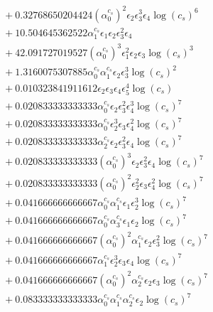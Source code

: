 \documentclass[10pt]{article}
\begin{document}
\begin{align*}
&{}  + 0.32768650204424 \left(\alpha_{0}^{c_s}\right)^{2} \epsilon_{2} \epsilon_{3}^{3} \epsilon_{4} \log{\left(c_{s} \right)}^{6} \\
&{}  + 10.504645362522 \alpha_{1}^{c_s} \epsilon_{1} \epsilon_{2} \epsilon_{3}^{2} \epsilon_{4} \\
&{}  + 42.091727019527 \left(\alpha_{0}^{c_s}\right)^{3} \epsilon_{1}^{2} \epsilon_{2} \epsilon_{3} \log{\left(c_{s} \right)}^{3} \\
&{}  + 1.3160075307885 \alpha_{0}^{c_s} \alpha_{1}^{c_s} \epsilon_{2} \epsilon_{3}^{3} \log{\left(c_{s} \right)}^{2} \\
&{}  + 0.010323841911612 \epsilon_{2} \epsilon_{3} \epsilon_{4} \epsilon_{5}^{4} \log{\left(c_{s} \right)} \\
&{}  + 0.020833333333333 \alpha_{0}^{c_s} \epsilon_{2} \epsilon_{3}^{2} \epsilon_{4}^{3} \log{\left(c_{s} \right)}^{7} \\
&{}  + 0.020833333333333 \alpha_{0}^{c_s} \epsilon_{2}^{3} \epsilon_{3} \epsilon_{4}^{2} \log{\left(c_{s} \right)}^{7} \\
&{}  + 0.020833333333333 \alpha_{2}^{c_s} \epsilon_{2} \epsilon_{3}^{2} \epsilon_{4} \log{\left(c_{s} \right)}^{7} \\
&{}  + 0.020833333333333 \left(\alpha_{0}^{c_s}\right)^{3} \epsilon_{2} \epsilon_{3}^{2} \epsilon_{4} \log{\left(c_{s} \right)}^{7} \\
&{}  + 0.020833333333333 \left(\alpha_{0}^{c_s}\right)^{2} \epsilon_{2}^{2} \epsilon_{3} \epsilon_{4}^{2} \log{\left(c_{s} \right)}^{7} \\
&{}  + 0.041666666666667 \alpha_{0}^{c_s} \alpha_{1}^{c_s} \epsilon_{1} \epsilon_{2}^{3} \log{\left(c_{s} \right)}^{7} \\
&{}  + 0.041666666666667 \alpha_{0}^{c_s} \alpha_{3}^{c_s} \epsilon_{1} \epsilon_{2} \log{\left(c_{s} \right)}^{7} \\
&{}  + 0.041666666666667 \left(\alpha_{0}^{c_s}\right)^{2} \alpha_{1}^{c_s} \epsilon_{2} \epsilon_{3}^{2} \log{\left(c_{s} \right)}^{7} \\
&{}  + 0.041666666666667 \alpha_{1}^{c_s} \epsilon_{2}^{3} \epsilon_{3} \epsilon_{4} \log{\left(c_{s} \right)}^{7} \\
&{}  + 0.041666666666667 \left(\alpha_{0}^{c_s}\right)^{2} \alpha_{2}^{c_s} \epsilon_{2} \epsilon_{3} \log{\left(c_{s} \right)}^{7} \\
&{}  + 0.083333333333333 \alpha_{0}^{c_s} \alpha_{1}^{c_s} \alpha_{2}^{c_s} \epsilon_{2} \log{\left(c_{s} \right)}^{7} \\

\end{align*}
\end{document}
